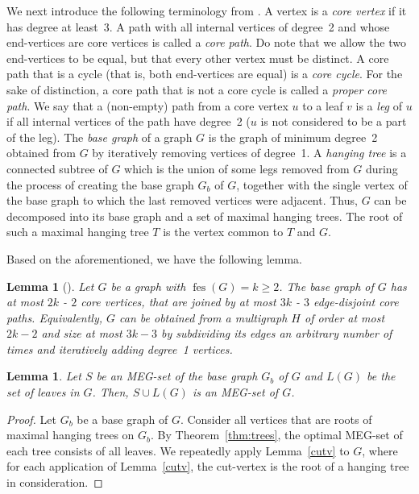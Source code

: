 \documentclass[10pt,a4paper]{amsart}
\theoremstyle{plain}
\newtheorem{lemma}[theorem]{Lemma}
\theoremstyle{definition}
\DeclareMathOperator{\fes}{fes}
\begin{document}
We next introduce the following terminology from \cite{r11}. A vertex is a \emph{core vertex} if it has degree at least~3. A path with all internal vertices of degree~2 and whose end-vertices are core vertices is called a \emph{core path}. Do note that we allow the two end-vertices to be equal, but that every other vertex must be distinct. A core path that is a cycle (that is, both end-vertices are equal) is a \emph{core cycle}. For the sake of distinction, a core path that is not a core cycle is called a \emph{proper core path}. We say that a (non-empty) path from a core vertex $u$ to a leaf $v$ is a \textit{leg} of $u$ if all internal vertices of the path have degree~2 ($u$ is not considered to be a part of the leg). The \emph{base graph} of a graph $G$ is the graph of minimum degree~2 obtained from $G$ by iteratively removing vertices of degree~1. A \emph{hanging tree} is a connected subtree of $G$ which is the union of some legs removed from $G$ during the process of creating the base graph $G_b$ of $G$, together with the single vertex of the base graph to which the last removed vertices were adjacent. Thus, $G$ can be decomposed into its base graph and a set of maximal hanging trees. The root of such a maximal hanging tree $T$ is the vertex common to $T$ and $G$.

Based on the aforementioned, we have the following lemma.
\begin{lemma}[\cite{r11,r12}]\label{cores}
Let $G$ be a graph with $\fes(G) = k \geq 2$. The base graph of $G$ has at most $2k$ - $2$ core vertices, that are joined by at most $3k$ - $3$ edge-disjoint core paths. Equivalently, $G$ can be obtained from a multigraph $H$ of order at most $2k-2$ and size at most $3k-3$ by subdividing its edges an arbitrary number of times and iteratively adding degree~1 vertices.
\end{lemma}

\begin{lemma}\label{base}
Let $S$ be an MEG-set of the base graph $G_b$ of $G$ and $L(G)$ be the set of leaves in $G$. Then, $S \cup L(G)$ is an MEG-set of $G$.
\end{lemma}
\begin{proof}
Let $G_b$ be a base graph of $G$. Consider all vertices that are roots of maximal hanging trees on $G_b$. By Theorem~\ref{thm:trees}, the optimal MEG-set of each tree consists of all leaves. We repeatedly apply Lemma~\ref{cutv} to $G$, where for each application of Lemma~\ref{cutv}, the cut-vertex is the root of a hanging tree in consideration.
\end{proof}
\end{document}
